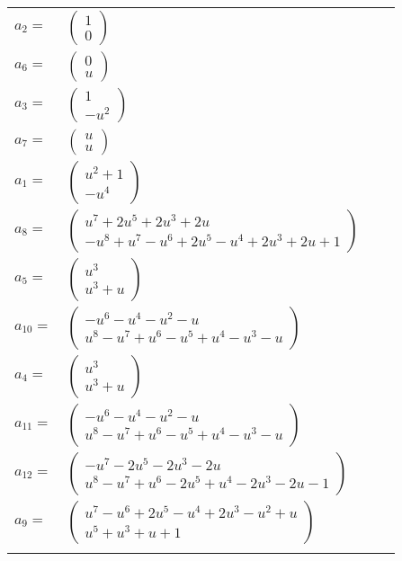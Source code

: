\documentclass[1p]{elsarticle_modified}
\theoremstyle{definition}
\begin{document}
\begin{tabular}{m{7pt} m{180pt} m{7pt} m{180pt} }
\flushright $a_{2}=$&$\begin{pmatrix}1\\0\end{pmatrix}$ \\
\flushright $a_{6}=$&$\begin{pmatrix}0\\u\end{pmatrix}$ \\
\flushright $a_{3}=$&$\begin{pmatrix}1\\- u^2\end{pmatrix}$ \\
\flushright $a_{7}=$&$\begin{pmatrix}u\\u\end{pmatrix}$ \\
\flushright $a_{1}=$&$\begin{pmatrix}u^2+1\\- u^4\end{pmatrix}$ \\
\flushright $a_{8}=$&$\begin{pmatrix}u^7+2 u^5+2 u^3+2 u\\- u^8+u^7- u^6+2 u^5- u^4+2 u^3+2 u+1\end{pmatrix}$ \\
\flushright $a_{5}=$&$\begin{pmatrix}u^3\\u^3+u\end{pmatrix}$ \\
\flushright $a_{10}=$&$\begin{pmatrix}- u^6- u^4- u^2- u\\u^8- u^7+u^6- u^5+u^4- u^3- u\end{pmatrix}$ \\
\flushright $a_{4}=$&$\begin{pmatrix}u^3\\u^3+u\end{pmatrix}$ \\
\flushright $a_{11}=$&$\begin{pmatrix}- u^6- u^4- u^2- u\\u^8- u^7+u^6- u^5+u^4- u^3- u\end{pmatrix}$ \\
\flushright $a_{12}=$&$\begin{pmatrix}- u^7-2 u^5-2 u^3-2 u\\u^8- u^7+u^6-2 u^5+u^4-2 u^3-2 u-1\end{pmatrix}$ \\
\flushright $a_{9}=$&$\begin{pmatrix}u^7- u^6+2 u^5- u^4+2 u^3- u^2+u\\u^5+u^3+u+1\end{pmatrix}$\\&\end{tabular}
\end{document}
